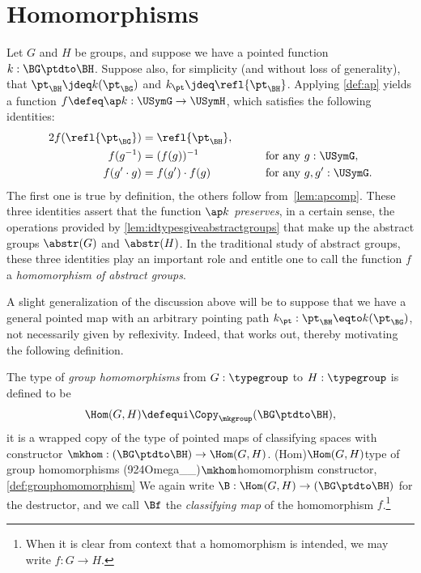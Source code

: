 \section{Homomorphisms}
\label{sec:homomorphisms}

\begin{remark}\label{rem:homom-eqs}
Let $G$ and $H$ be groups, and suppose we have a pointed function $k : \BG \ptdto \BH$.
Suppose also, for simplicity (and without loss of generality),
that $\pt_\BH \jdeq k ( \pt_\BG ) $ and $k_\pt \jdeq \refl{\pt_\BH}$.
Applying \cref{def:ap} yields a function $f \defeq \ap k : \USymG \to \USymH$, which satisfies the following identities:
\begin{alignat*}2
  f ( \refl {\pt_\BG} ) & = \refl{\pt_\BH},  &\qquad&                            \\
  f (g ^ {-1})     & = (f (g))^{-1}         && \text {for any $g : \USymG$},    \\
  f (g' \cdot g)   & =  f (g') \cdot  f (g) && \text {for any $g, g' : \USymG$}.
\end{alignat*}
The first one is true by definition, the others follow from~\cref{lem:apcomp}.
These three identities assert that the function $\ap k$ \emph{preserves}, in a certain sense, the operations provided by \cref{lem:idtypesgiveabstractgroups} that
make up the abstract groups $\abstr(G)$ and $\abstr(H)$.
In the traditional study of abstract groups, these three identities play an important role and entitle one to call the function $f$ a
\emph{homomorphism of abstract groups}.
\end{remark}

A slight generalization of the discussion above will be to suppose that we have a general pointed map with an arbitrary pointing path
$k_\pt : \pt_\BH \eqto k ( \pt_\BG ) $,
not necessarily given by reflexivity.  Indeed, that works out, thereby motivating the following definition.

\begin{definition}\label{def:grouphomomorphism}
  The type of \emph{group homomorphisms}
  from $G:\typegroup$ to
  $H:\typegroup$ is defined to be
\[
    \Hom(G,H)\defequi\Copy_{\mkgroup}(\BG\ptdto\BH),
  \]
  \ie it is a wrapped copy of the type of pointed maps of classifying spaces
  with constructor
  $\mkhom : (\BG \ptdto \BH) \to \Hom(G,H)$.%
  \glossary(Hom){$\protect\Hom(G,H)$}{type of group homomorphisms}%
  \glossary(924Omega__){$\protect\mkhom$}{homomorphism constructor,
    \cref{def:grouphomomorphism}}
  We again write $\B : \Hom(G,H) \to (\BG \ptdto \BH)$ for the destructor,
  and we call $\Bf$ the \emph{classifying map}
  of the homomorphism $f$.\footnote{%
    When it is clear from context that a homomorphism is intended,
    we may write $f : G \to H$.}
\end{definition}

